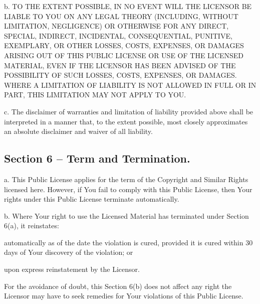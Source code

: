 b. TO T\+HE E\+X\+T\+E\+NT P\+O\+S\+S\+I\+B\+LE, IN NO E\+V\+E\+NT W\+I\+LL T\+HE L\+I\+C\+E\+N\+S\+OR BE L\+I\+A\+B\+LE TO Y\+OU ON A\+NY L\+E\+G\+AL T\+H\+E\+O\+RY (I\+N\+C\+L\+U\+D\+I\+NG, W\+I\+T\+H\+O\+UT L\+I\+M\+I\+T\+A\+T\+I\+ON, N\+E\+G\+L\+I\+G\+E\+N\+CE) OR O\+T\+H\+E\+R\+W\+I\+SE F\+OR A\+NY D\+I\+R\+E\+CT, S\+P\+E\+C\+I\+AL, I\+N\+D\+I\+R\+E\+CT, I\+N\+C\+I\+D\+E\+N\+T\+AL, C\+O\+N\+S\+E\+Q\+U\+E\+N\+T\+I\+AL, P\+U\+N\+I\+T\+I\+VE, E\+X\+E\+M\+P\+L\+A\+RY, OR O\+T\+H\+ER L\+O\+S\+S\+ES, C\+O\+S\+TS, E\+X\+P\+E\+N\+S\+ES, OR D\+A\+M\+A\+G\+ES A\+R\+I\+S\+I\+NG O\+UT OF T\+H\+IS P\+U\+B\+L\+IC L\+I\+C\+E\+N\+SE OR U\+SE OF T\+HE L\+I\+C\+E\+N\+S\+ED M\+A\+T\+E\+R\+I\+AL, E\+V\+EN IF T\+HE L\+I\+C\+E\+N\+S\+OR H\+AS B\+E\+EN A\+D\+V\+I\+S\+ED OF T\+HE P\+O\+S\+S\+I\+B\+I\+L\+I\+TY OF S\+U\+CH L\+O\+S\+S\+ES, C\+O\+S\+TS, E\+X\+P\+E\+N\+S\+ES, OR D\+A\+M\+A\+G\+ES. W\+H\+E\+RE A L\+I\+M\+I\+T\+A\+T\+I\+ON OF L\+I\+A\+B\+I\+L\+I\+TY IS N\+OT A\+L\+L\+O\+W\+ED IN F\+U\+LL OR IN P\+A\+RT, T\+H\+IS L\+I\+M\+I\+T\+A\+T\+I\+ON M\+AY N\+OT A\+P\+P\+LY TO Y\+OU.

c. The disclaimer of warranties and limitation of liability provided above shall be interpreted in a manner that, to the extent possible, most closely approximates an absolute disclaimer and waiver of all liability.

\subsection*{Section 6 -- Term and Termination.}

a. This Public License applies for the term of the Copyright and Similar Rights licensed here. However, if You fail to comply with this Public License, then Your rights under this Public License terminate automatically.

b. Where Your right to use the Licensed Material has terminated under Section 6(a), it reinstates\+:


\begin{DoxyEnumerate}
\item automatically as of the date the violation is cured, provided it is cured within 30 days of Your discovery of the violation; or
\item upon express reinstatement by the Licensor.
\end{DoxyEnumerate}

For the avoidance of doubt, this Section 6(b) does not affect any right the Licensor may have to seek remedies for Your violations of this Public License.

